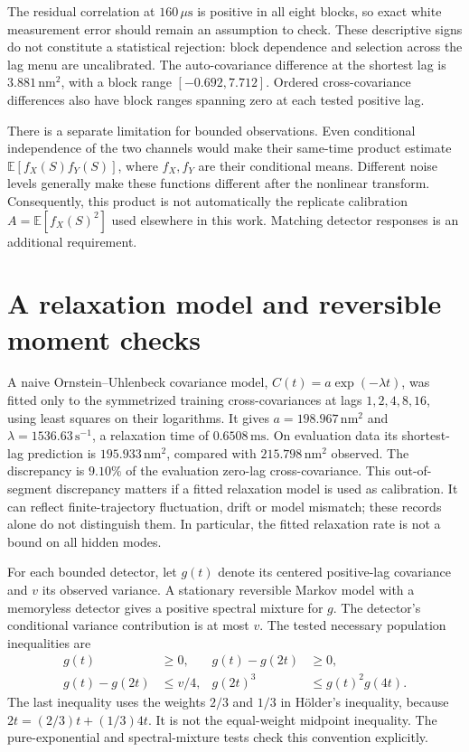 The residual correlation at $160\,\mu\mathrm{s}$ is positive in all eight
blocks, so exact white measurement error should remain an assumption to
check. These descriptive signs do not constitute a statistical rejection:
block dependence and selection across the lag menu are uncalibrated. The
auto-covariance difference at the shortest lag is $3.881\,\mathrm{nm}^2$,
with a block range $[-0.692,7.712]$. Ordered cross-covariance differences
also have block ranges spanning zero at each tested positive lag.

There is a separate limitation for bounded observations. Even conditional
independence of the two channels would make their same-time product estimate
$\mathbb E[f_X(S)f_Y(S)]$, where $f_X,f_Y$ are their conditional means.
Different noise levels generally make these functions different after the
nonlinear transform. Consequently, this product is not automatically the
replicate calibration $A=\mathbb E[f_X(S)^2]$ used elsewhere in this work.
Matching detector responses is an additional requirement.

\section{A relaxation model and reversible moment checks}

A naive Ornstein--Uhlenbeck covariance model,
$C(t)=a\exp(-\lambda t)$, was fitted only to the symmetrized training
cross-covariances at lags $1,2,4,8,16$, using least squares on their logarithms.
It gives $a=198.967\,\mathrm{nm}^2$ and
$\lambda=1536.63\,\mathrm{s}^{-1}$, a relaxation time of
$0.6508\,\mathrm{ms}$. On evaluation data its shortest-lag prediction is
$195.933\,\mathrm{nm}^2$, compared with $215.798\,\mathrm{nm}^2$ observed.
The discrepancy is $9.10\%$ of the evaluation zero-lag cross-covariance.
This out-of-segment discrepancy matters if a fitted relaxation model is used
as calibration. It can reflect finite-trajectory fluctuation, drift or model
mismatch; these records alone do not distinguish them. In particular, the
fitted relaxation rate is not a bound on all hidden modes.

For each bounded detector, let $g(t)$ denote its centered positive-lag
covariance and $v$ its observed variance. A stationary reversible Markov
model with a memoryless detector gives a positive spectral mixture for $g$.
The detector's conditional variance contribution is at most $v$. The tested
necessary population inequalities are
\begin{align}
 g(t)&\geq0, & g(t)-g(2t)&\geq0,\\
 g(t)-g(2t)&\leq v/4, & g(2t)^3&\leq g(t)^2g(4t).
\end{align}
The last inequality uses the weights $2/3$ and $1/3$ in H\"older's
inequality, because $2t=(2/3)t+(1/3)4t$. It is not the equal-weight
midpoint inequality. The pure-exponential and spectral-mixture tests check
this convention explicitly.

